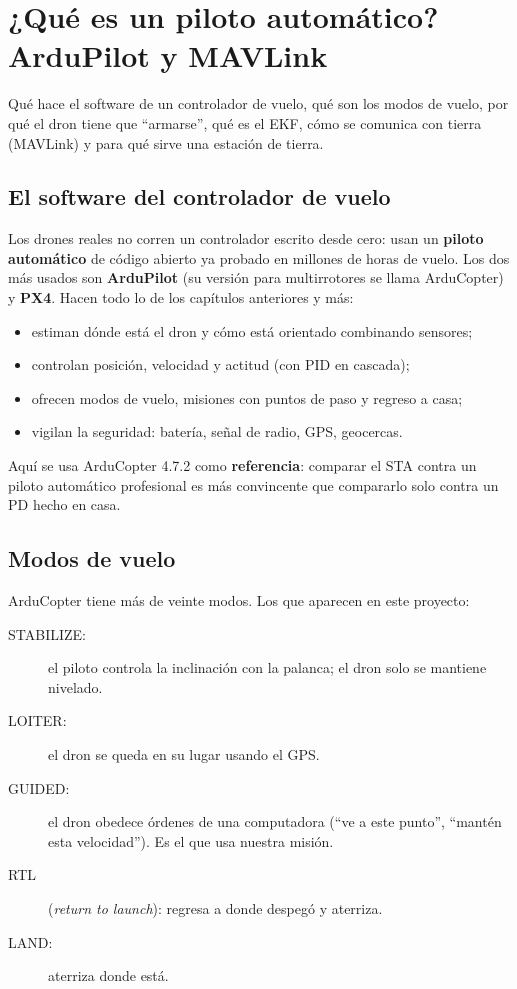 \chapter{¿Qué es un piloto automático? ArduPilot y MAVLink}
\label{cap:autopiloto}

\begin{enpocas}
Qué hace el software de un controlador de vuelo, qué son los modos de vuelo, por qué el dron tiene que
``armarse'', qué es el EKF, cómo se comunica con tierra (MAVLink) y para qué sirve una estación de
tierra.
\end{enpocas}

\section{El software del controlador de vuelo}

Los drones reales no corren un controlador escrito desde cero: usan un \textbf{piloto automático} de
código abierto ya probado en millones de horas de vuelo. Los dos más usados son \textbf{ArduPilot}
(su versión para multirrotores se llama ArduCopter) y \textbf{PX4}. Hacen todo lo de los capítulos
anteriores y más:
\begin{itemize}
  \item estiman dónde está el dron y cómo está orientado combinando sensores;
  \item controlan posición, velocidad y actitud (con PID en cascada);
  \item ofrecen modos de vuelo, misiones con puntos de paso y regreso a casa;
  \item vigilan la seguridad: batería, señal de radio, GPS, geocercas.
\end{itemize}
Aquí se usa ArduCopter 4.7.2 como \textbf{referencia}: comparar el STA contra un piloto
automático profesional es más convincente que compararlo solo contra un PD hecho en casa.

\section{Modos de vuelo}

ArduCopter tiene más de veinte modos. Los que aparecen en este proyecto:
\begin{description}
  \item[STABILIZE:] el piloto controla la inclinación con la palanca; el dron solo se mantiene
        nivelado.
  \item[LOITER:] el dron se queda en su lugar usando el GPS.
  \item[GUIDED:] el dron obedece órdenes de una computadora (``ve a este punto'', ``mantén esta
        velocidad''). Es el que usa nuestra misión.
  \item[RTL] (\emph{return to launch}): regresa a donde despegó y aterriza.
  \item[LAND:] aterriza donde está.
\end{description}

